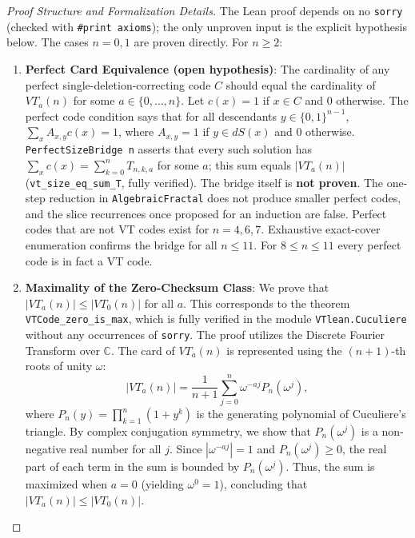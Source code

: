 \documentclass[11pt,a4paper]{article}
\theoremstyle{definition}
\begin{document}
\begin{proof}[Proof Structure and Formalization Details]
The Lean proof depends on no \texttt{sorry} (checked with \texttt{\#print axioms}); the only unproven input is the explicit hypothesis below. The cases $n = 0, 1$ are proven directly. For $n \ge 2$:
\begin{enumerate}
\item \textbf{Perfect Card Equivalence (open hypothesis)}: The cardinality of any perfect single-deletion-correcting code $C$ should equal the cardinality of $VT_a(n)$ for some $a \in \{0, \dots, n\}$. Let $c(x) = 1$ if $x \in C$ and $0$ otherwise. The perfect code condition says that for all descendants $y \in \{0,1\}^{n-1}$, $\sum_x A_{x,y} c(x) = 1$, where $A_{x,y} = 1$ if $y \in dS(x)$ and $0$ otherwise.
\texttt{PerfectSizeBridge n} asserts that every such solution has $\sum_x c(x) = \sum_{k=0}^n T_{n,k,a}$ for some $a$; this sum equals $|VT_a(n)|$ (\texttt{vt\_size\_eq\_sum\_T}, fully verified). The bridge itself is \textbf{not proven}. The one-step reduction in \texttt{AlgebraicFractal} does not produce smaller perfect codes, and the slice recurrences once proposed for an induction are false. Perfect codes that are not VT codes exist for $n = 4, 6, 7$. Exhaustive exact-cover enumeration confirms the bridge for all $n \le 11$. For $8 \le n \le 11$ every perfect code is in fact a VT code.
\item \textbf{Maximality of the Zero-Checksum Class}: We prove that $|VT_a(n)| \le |VT_0(n)|$ for all $a$. This corresponds to the theorem \texttt{VTCode\_zero\_is\_max}, which is fully verified in the module \texttt{VTlean.Cuculiere} without any occurrences of \texttt{sorry}. The proof utilizes the Discrete Fourier Transform over $\mathbb{C}$. The card of $VT_a(n)$ is represented using the $(n+1)$-th roots of unity $\omega$:
\begin{equation}
|VT_a(n)| = \frac{1}{n+1} \sum_{j=0}^n \omega^{-aj} P_n(\omega^j),
\end{equation}
where $P_n(y) = \prod_{k=1}^n (1 + y^k)$ is the generating polynomial of Cuculiere's triangle. By complex conjugation symmetry, we show that $P_n(\omega^j)$ is a non-negative real number for all $j$. Since $|\omega^{-aj}| = 1$ and $P_n(\omega^j) \ge 0$, the real part of each term in the sum is bounded by $P_n(\omega^j)$. Thus, the sum is maximized when $a = 0$ (yielding $\omega^0 = 1$), concluding that $|VT_a(n)| \le |VT_0(n)|$.
\end{enumerate}
\end{proof}
\end{document}

